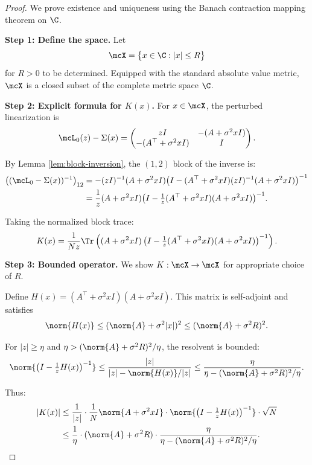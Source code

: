 \begin{proof}
We prove existence and uniqueness using the Banach contraction mapping theorem on $\C$.

\textbf{Step 1: Define the space.}
Let
\[
\mcX = \bigl\{x \in \C : |x| \leq R\bigr\}
\]
for $R > 0$ to be determined. Equipped with the standard absolute value metric, $\mcX$ is a closed subset of the complete metric space $\C$.

\textbf{Step 2: Explicit formula for $K(x)$.}
For $x \in \mcX$, the perturbed linearization is
\[
\mcL_0(z) - \Sigma(x)
= \begin{pmatrix} zI & -(A + \sigma^2 x I) \\ -(A^\top + \sigma^2 x I) & I \end{pmatrix}.
\]

By Lemma \ref{lem:block-inversion}, the $(1,2)$ block of the inverse is:
\begin{align}
\bigl((\mcL_0 - \Sigma(x))^{-1}\bigr)_{12}
&= -(zI)^{-1}(A + \sigma^2 x I) \bigl(I - (A^\top + \sigma^2 x I)(zI)^{-1}(A + \sigma^2 x I)\bigr)^{-1} \notag\\
&= \frac{1}{z}(A + \sigma^2 x I) \bigl(I - \tfrac{1}{z}(A^\top + \sigma^2 x I)(A + \sigma^2 x I)\bigr)^{-1}. \label{eq:K-explicit}
\end{align}

Taking the normalized block trace:
\begin{equation}\label{eq:K-formula}
K(x) = \frac{1}{Nz}\Tr\left((A + \sigma^2 x I)\left(I - \tfrac{1}{z}(A^\top + \sigma^2 x I)(A + \sigma^2 x I)\right)^{-1}\right).
\end{equation}

\textbf{Step 3: Bounded operator.}
We show $K: \mcX \to \mcX$ for appropriate choice of $R$.

Define $H(x) = (A^\top + \sigma^2 x I)(A + \sigma^2 x I)$. This matrix is self-adjoint and satisfies
\[
\norm{H(x)} \leq (\norm{A} + \sigma^2 |x|)^2 \leq (\norm{A} + \sigma^2 R)^2.
\]

For $|z| \geq \eta$ and $\eta > (\norm{A} + \sigma^2 R)^2/\eta$, the resolvent is bounded:
\[
\norm{\bigl(I - \tfrac{1}{z}H(x)\bigr)^{-1}} \leq \frac{|z|}{|z| - \norm{H(x)}/|z|} \leq \frac{\eta}{\eta - (\norm{A} + \sigma^2 R)^2/\eta}.
\]

Thus:
\begin{align}
|K(x)|
&\leq \frac{1}{|z|} \cdot \frac{1}{N}\norm{A + \sigma^2 x I} \cdot \norm{\bigl(I - \tfrac{1}{z}H(x)\bigr)^{-1}} \cdot \sqrt{N} \notag\\
&\leq \frac{1}{\eta} \cdot (\norm{A} + \sigma^2 R) \cdot \frac{\eta}{\eta - (\norm{A} + \sigma^2 R)^2/\eta}. \label{eq:K-bound}
\end{align}


\end{proof}
